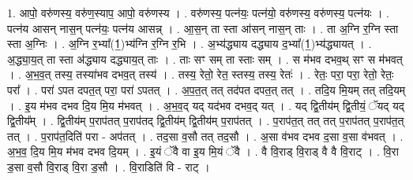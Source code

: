 \documentclass[17pt]{extarticle}
\begin{document}
1. आपो॒ वरु॑णस्य॒ वरु॑ण॒स्याप॒ आपो॒ वरु॑णस्य । . वरु॑णस्य॒ पत्न॑यः॒ पत्न॑यो॒ वरु॑णस्य॒ वरु॑णस्य॒ पत्न॑यः । . पत्न॑य आसन् नास॒न् पत्न॑यः॒ पत्न॑य आसन्न् । . आ॒स॒न् ता स्ता आ॑सन् नास॒न् ताः । . ता अ॒ग्नि र॒ग्नि स्ता स्ता अ॒ग्निः । . अ॒ग्नि र॒भ्या᳚(1॒)भ्य॑ग्नि र॒ग्नि र॒भि । . अ॒भ्य॑द्ध्याय दद्ध्याय द॒भ्या᳚(1॒)भ्य॑द्ध्यायत् । . अ॒द्ध्या॒य॒त् ता स्ता अ॑द्ध्याय दद्ध्याय॒त् ताः । . ताः सꣳ सम् ता स्ताः सम् । . स म॑भव दभव॒थ् सꣳ स म॑भवत् । . अ॒भ॒व॒त् तस्य॒ तस्या॑भव दभव॒त् तस्य॑ । . तस्य॒ रेतो॒ रेत॒ स्तस्य॒ तस्य॒ रेतः॑ । . रेतः॒ परा॒ परा॒ रेतो॒ रेतः॒ परा᳚ । . परा॑ ऽपत दपत॒त् परा॒ परा॑ ऽपतत् । . अ॒प॒त॒त् तत् तद॑पत दपत॒त् तत् । . तदि॒य मि॒यम् तत् तदि॒यम् । . इ॒य म॑भव दभव दि॒य मि॒य म॑भवत् । . अ॒भ॒व॒द् यद् यद॑भव दभव॒द् यत् । . यद् द्वि॒तीय॑म् द्वि॒तीयं॒ ॅयद् यद् द्वि॒तीय᳚म् । . द्वि॒तीय॑म् प॒राप॑तत् प॒राप॑तद् द्वि॒तीय॑म् द्वि॒तीय॑म् प॒राप॑तत् । . प॒राप॑त॒त् तत् तत् प॒राप॑तत् प॒राप॑त॒त् तत् । . प॒राप॑त॒दिति॑ परा - अप॑तत् । . तद॒सा व॒सौ तत् तद॒सौ । . अ॒सा व॑भव दभव द॒सा व॒सा व॑भवत् । . अ॒भ॒व॒ दि॒य मि॒य म॑भव दभव दि॒यम् । . इ॒यं ॅवै वा इ॒य मि॒यं ॅवै । . वै वि॒राड् वि॒राड् वै वै वि॒राट् । . वि॒रा ड॒सा व॒सौ वि॒राड् वि॒रा ड॒सौ । . वि॒राडिति॑ वि - राट् । \newline
\end{document}
